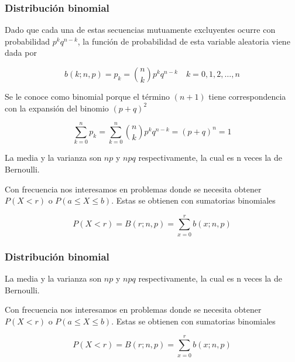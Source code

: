 \documentclass[spanish]{beamer}
\begin{document}
\begin{frame}
\frametitle{Distribución binomial}

Dado que cada una de estas secuencias mutuamente excluyentes ocurre con probabilidad $p^k q^{n - k}$, la función de probabilidad de esta variable aleatoria viene dada por


$$
b(k; n, p) = p_{k}=\binom{n}{k}p^k q^{n - k} \quad k=0,1,2,\ldots,n
$$


Se le conoce como binomial porque el término $(n+1)$ tiene correspondencia con la expansión del binomio $(p+q)^2$

$$
\displaystyle \sum_{k=0}^{n}{p_{k}}= \sum_{k=0}^{n} \binom{n}{k}p^k q^{n - k}= (p+q)^n=1 
$$

La media y la varianza son $np$ y $npq$ respectivamente, la cual es n veces la de Bernoulli.

Con frecuencia nos interesamos en problemas donde se necesita obtener $P(X < r) \text{ o } P(a \leq X \leq b)$. Estas se obtienen con sumatorias binomiales

$$
P(X < r)= B (r; n, p) =\displaystyle \sum_{x=0}^{r} b(x; n, p)
$$

\end{frame}


\begin{frame}
\frametitle{Distribución binomial}

La media y la varianza son $np$ y $npq$ respectivamente, la cual es n veces la de Bernoulli.

Con frecuencia nos interesamos en problemas donde se necesita obtener $P(X < r) \text{ o } P(a \leq X \leq b)$. Estas se obtienen con sumatorias binomiales

$$
P(X < r)= B (r; n, p) =\displaystyle \sum_{x=0}^{r} b(x; n, p)
$$

\end{frame}
\end{document}
